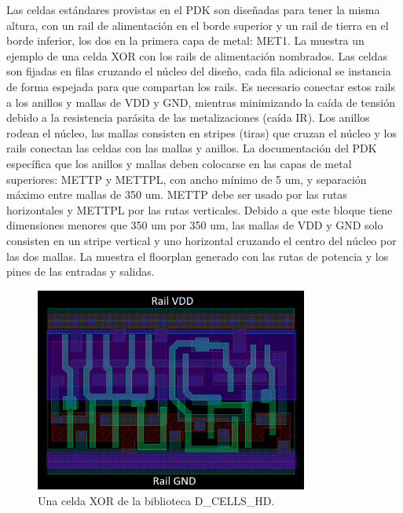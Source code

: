 \documentclass[a4paper, twoside, 11pt]{report}
\begin{document}
Las celdas estándares provistas en el PDK son diseñadas para tener la misma altura, con un rail de alimentación en el borde superior y un rail de tierra en el borde inferior, los dos en la primera capa de metal: MET1. La  muestra un ejemplo de una celda XOR con los rails de alimentación nombrados. Las celdas son fijadas en filas cruzando el núcleo del diseño, cada fila adicional se instancia de forma espejada para que compartan los rails. Es necesario conectar estos rails a los anillos y mallas de VDD y GND, mientras minimizando la caída de tensión debido a la resistencia parásita de las metalizaciones (caída IR). Los anillos rodean el núcleo, las mallas consisten en stripes (tiras) que cruzan el núcleo y los rails conectan las celdas con las mallas y anillos. La documentación del PDK~\cite{dig_imp_guidelines} específica que los anillos y mallas deben colocarse en las capas de metal superiores: METTP y METTPL, con ancho mínimo de 5 um, y separación máximo entre mallas de 350 um. METTP debe ser usado por las rutas horizontales y METTPL por las rutas verticales. Debido a que este bloque tiene dimensiones menores que 350 um por 350 um, las mallas de VDD y GND solo consisten en un stripe vertical y uno horizontal cruzando el centro del núcleo por las dos mallas. La  muestra el floorplan generado con las rutas de potencia y los pines de las entradas y salidas.

\begin{figure}[htb]
  \centering
  \includegraphics[width=0.8\textwidth]{./img/xor_cell}
  \caption{Una celda XOR de la biblioteca D\_CELLS\_HD.}
  \label{fig:xor_cell}
\end{figure}
\end{document}
